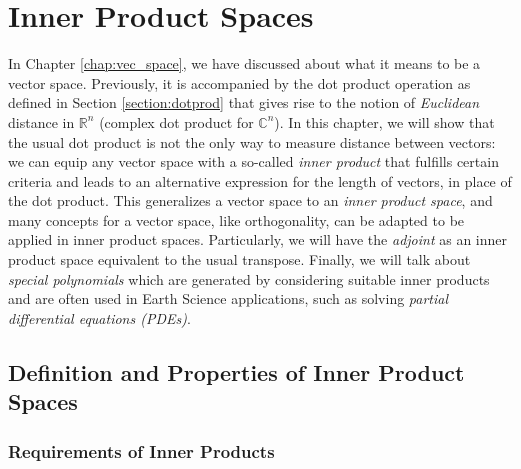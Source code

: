 \chapter{Inner Product Spaces}

In Chapter \ref{chap:vec_space}, we have discussed about what it means to be a vector space. Previously, it is accompanied by the dot product operation as defined in Section \ref{section:dotprod} that gives rise to the notion of \textit{Euclidean} distance in $\mathbb{R}^n$ (complex dot product for $\mathbb{C}^n$). In this chapter, we will show that the usual dot product is not the only way to measure distance between vectors: we can equip any vector space with a so-called \textit{inner product} that fulfills certain criteria and leads to an alternative expression for the length of vectors, in place of the dot product. This generalizes a vector space to an \textit{inner product space}, and many concepts for a vector space, like orthogonality, can be adapted to be applied in inner product spaces. Particularly, we will have the \textit{adjoint} as an inner product space equivalent to the usual transpose. Finally, we will talk about \textit{special polynomials} which are generated by considering suitable inner products and are often used in Earth Science applications, such as solving \textit{partial differential equations (PDEs)}.

\section{Definition and Properties of Inner Product Spaces}

\subsection{Requirements of Inner Products}

